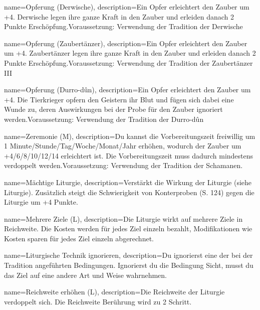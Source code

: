 {
    name={Opferung (Derwische)},
    description={Ein Opfer erleichtert den Zauber um +4. Derwische legen ihre ganze Kraft in den Zauber und erleiden danach 2 Punkte Erschöpfung.\newline Voraussetzung: Verwendung der Tradition der Derwische}
}


{
    name={Opferung (Zaubertänzer)},
    description={Ein Opfer erleichtert den Zauber um +4. Zaubertänzer legen ihre ganze Kraft in den Zauber und erleiden danach 2 Punkte Erschöpfung.\newline Voraussetzung: Verwendung der Tradition der Zaubertänzer III}
}


{
    name={Opferung (Durro-dûn)},
    description={Ein Opfer erleichtert den Zauber um +4. Die Tierkrieger opfern den Geistern ihr Blut und fügen sich dabei eine Wunde zu, deren Auswirkungen bei der Probe für den Zauber ignoriert werden.\newline Voraussetzung: Verwendung der Tradition der Durro-dûn}
}


{
    name={Zeremonie (M)},
    description={Du kannst die Vorbereitungszeit freiwillig um 1 Minute/Stunde/Tag/Woche/Monat/Jahr erhöhen, wodurch der Zauber um +4/6/8/10/12/14 erleichtert ist. Die Vorbereitungszeit muss dadurch mindestens verdoppelt werden.\newline Voraussetzung: Verwendung der Tradition der Schamanen.}
}


{
    name={Mächtige Liturgie},
    description={Verstärkt die Wirkung der Liturgie (siehe Liturgie). Zusätzlich steigt die Schwierigkeit von Konterproben (S. 124) gegen die Liturgie um +4 Punkte.}
}


{
    name={Mehrere Ziele (L)},
    description={Die Liturgie wirkt auf mehrere Ziele in Reichweite. Die Kosten werden für jedes Ziel einzeln bezahlt, Modifikationen wie Kosten sparen für jedes Ziel einzeln abgerechnet.}
}


{
    name={Liturgische Technik ignorieren},
    description={Du ignorierst eine der bei der Tradition angeführten Bedingungen. Ignorierst du die Bedingung Sicht, musst du das Ziel auf eine andere Art und Weise wahrnehmen.}
}


{
    name={Reichweite erhöhen (L)},
    description={Die Reichweite der Liturgie verdoppelt sich. Die Reichweite Berührung wird zu 2 Schritt.}
}


